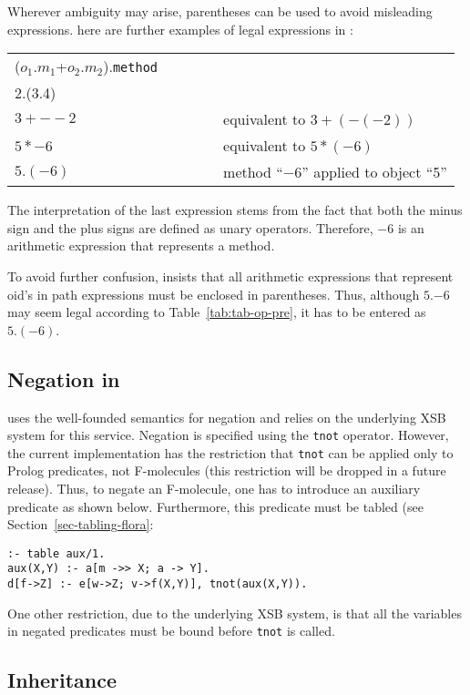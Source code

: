 \documentclass[11pt]{report}
\begin{document}
Wherever ambiguity may arise, parentheses can be used to avoid misleading
expressions. here are further examples of legal expressions in \FLORA:

\begin{table}[h]
\begin{tabular}{lll}
($o_1$.$m_1$+$o_2$.$m_2$).{\tt method} \\
2.(3.4) \\
$3+--2$ && equivalent to $3+(-(-2))$ \\
$5*-6$ && equivalent to $5*(-6)$ \\
$5.(-6)$ &~~~~~& method ``$-6$'' applied to object ``5''
\end{tabular}
\end{table}

\noindent
The interpretation of the last expression stems from the fact that both the
minus sign and the plus signs are defined as unary operators. Therefore,
$-6$ is an arithmetic expression that represents a method.

To avoid further confusion, \FLORA insists that all arithmetic expressions
that represent oid's in path expressions must be enclosed in parentheses.
Thus, although $5.$$-6$ may seem legal according to
Table~\ref{tab:tab-op-pre}, it has to be entered as $5.(-6)$.

\subsection{Negation in \FLORA}

\FLORA uses the well-founded semantics for negation and relies on the
underlying XSB system for this service. Negation is specified using the
{\tt tnot} operator. However, the current implementation has the
restriction that {\tt tnot} can be applied only to Prolog predicates, not
F-molecules (this restriction will be dropped in a future release). Thus,
to negate an F-molecule, one has to introduce an auxiliary predicate as
shown below. Furthermore, this predicate must be tabled (see
Section~\ref{sec-tabling-flora}:
\begin{verbatim}
:- table aux/1.
aux(X,Y) :- a[m ->> X; a -> Y].
d[f->Z] :- e[w->Z; v->f(X,Y)], tnot(aux(X,Y)).
\end{verbatim}
One other restriction, due to the underlying XSB system, is that all the
variables in negated predicates must be bound before {\tt tnot} is called.

\subsection{Inheritance}
\end{document}
